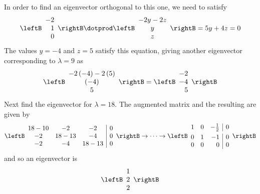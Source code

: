 \begin{solution}
In order to find an eigenvector orthogonal to this one, we need to satisfy 
\begin{equation*}
\leftB
\begin{array}{r}
-2 \\ 
1 \\ 
0
\end{array}
\rightB \dotprod \leftB
\begin{array}{c}
-2y-2z \\ 
y \\ 
z
\end{array}
\rightB =5y+4z=0
\end{equation*}
The values $y=-4$ and $z=5$ satisfy this equation, giving another eigenvector
corresponding to $\lambda=9$ as 
\begin{equation*}
\leftB
\begin{array}{c}
-2\left( -4\right) -2\left( 5\right) \\ 
\left( -4\right) \\ 
5
\end{array}
\rightB =\leftB
\begin{array}{r}
-2 \\ 
-4 \\ 
5
\end{array}
\rightB
\end{equation*}
Next find the eigenvector for $\lambda =18.$ The augmented matrix and the resulting {\rref} are given by  
\begin{equation*}
\leftB
\begin{array}{ccc|c}
18-10 & -2 & -2 & 0 \\ 
-2 & 18-13 & -4 & 0 \\ 
-2 & -4 & 18-13 & 0
\end{array}
\rightB
\rightarrow \cdots \rightarrow
\leftB
\begin{array}{rrr|r}
1 & 0 & -\vspace{0.05in}\frac{1}{2} & 0 \\ 
0 & 1 & -1 & 0 \\ 
0 & 0 & 0 & 0
\end{array}
\rightB
\end{equation*}
and so an eigenvector is 
\begin{equation*}
\leftB
\begin{array}{r}
1 \\ 
2 \\ 
2
\end{array}
\rightB
\end{equation*}


\end{solution}
